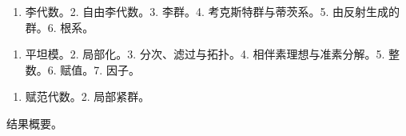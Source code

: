
\begin{enumerate}
\def\labelenumi{\arabic{enumi}.}
\tightlist
\item
  李代数。2. 自由李代数。3. 李群。4. 考克斯特群与蒂茨系。5. 由反射生成的群。6. 根系。
\end{enumerate}


\begin{enumerate}
\def\labelenumi{\arabic{enumi}.}
\tightlist
\item
  平坦模。2. 局部化。3. 分次、滤过与拓扑。4. 相伴素理想与准素分解。5. 整数。6. 赋值。7. 因子。
\end{enumerate}


\begin{enumerate}
\def\labelenumi{\arabic{enumi}.}
\tightlist
\item
  赋范代数。2. 局部紧群。
\end{enumerate}


结果概要。

